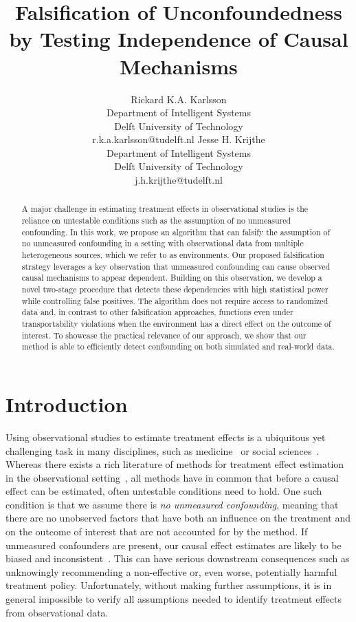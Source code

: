 \documentclass{article}
\title{Falsification of Unconfoundedness by Testing Independence of Causal Mechanisms}
\author{Rickard K.A. Karlsson \\ Department of Intelligent Systems \\ Delft University of Technology \\ r.k.a.karlsson@tudelft.nl \And Jesse H. Krijthe \\ Department of Intelligent Systems \\ Delft University of Technology \\ j.h.krijthe@tudelft.nl}
\begin{document}
\maketitle

\begin{abstract}
A major challenge in estimating treatment effects in observational studies is the reliance on untestable conditions such as the assumption of no unmeasured confounding. In this work, we propose an algorithm that can falsify the assumption of no unmeasured confounding in a setting with observational data from multiple heterogeneous sources, which we refer to as environments. Our proposed falsification strategy leverages a key observation that unmeasured confounding can cause observed causal mechanisms to appear dependent. Building on this observation, we develop a novel two-stage procedure that detects these dependencies with high statistical power while controlling false positives. The algorithm does not require access to randomized data and, in contrast to other falsification approaches, functions even under transportability violations when the environment has a direct effect on the outcome of interest. To showcase the practical relevance of our approach, we show that our method is able to efficiently detect confounding on both simulated and real-world data.
\end{abstract}



\section{Introduction}
Using observational studies to estimate treatment effects is a ubiquitous yet challenging task in many disciplines, such as medicine~\citep{hernan2006estimating} or social sciences~\citep{athey2017state}. Whereas there exists a rich literature of methods for treatment effect estimation in the observational setting~\citep{bang2005doubly, wager2018estimation, chernozhukov2018double}, all methods have in common that before a causal effect can be estimated, often untestable conditions need to hold. One such condition is that we assume there is \textit{no unmeasured confounding}, meaning that there are no unobserved factors that have both an influence on the treatment and on the outcome of interest that are not accounted for by the method. If unmeasured confounders are present, our causal effect estimates are likely to be biased and inconsistent~\citep{greenland1999confounding}. This can have serious downstream consequences such as unknowingly recommending a non-effective or, even worse, potentially harmful treatment policy. Unfortunately, without making further assumptions, it is in general impossible to verify all assumptions needed to identify treatment effects from observational data.
\end{document}
